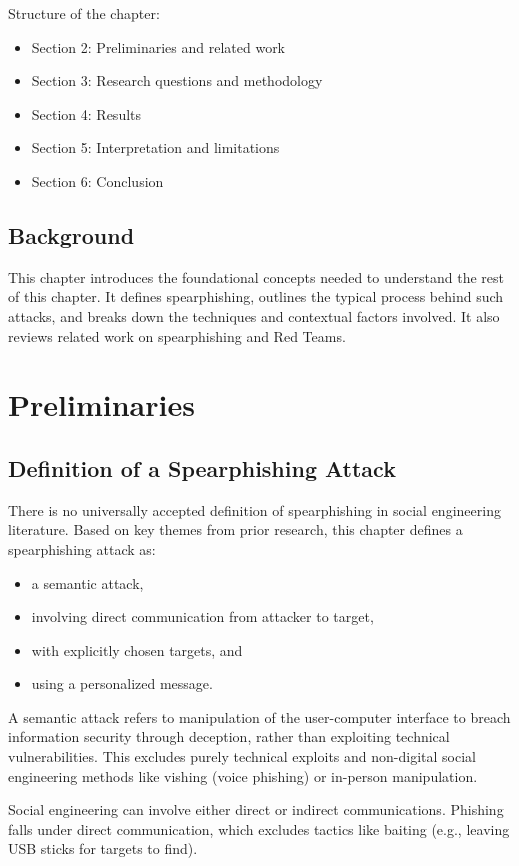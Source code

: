 Structure of the chapter:
\begin{itemize}
    \item Section 2: Preliminaries and related work
    \item Section 3: Research questions and methodology
    \item Section 4: Results
    \item Section 5: Interpretation and limitations
    \item Section 6: Conclusion
\end{itemize}

\subsection{Background}
This chapter introduces the foundational concepts needed to understand the rest of this chapter. It defines spearphishing, outlines the typical process behind such attacks, and breaks down the techniques and contextual factors involved. It also reviews related work on spearphishing and Red Teams.

\section{Preliminaries}
\subsection{Definition of a Spearphishing Attack}

There is no universally accepted definition of spearphishing in social engineering literature. Based on key themes from prior research, this chapter defines a spearphishing attack as:
\begin{itemize}
    \item a semantic attack,
    \item involving direct communication from attacker to target,
    \item with explicitly chosen targets, and
    \item using a personalized message.
\end{itemize}

A semantic attack refers to manipulation of the user-computer interface to breach information security through deception, rather than exploiting technical vulnerabilities. This excludes purely technical exploits and non-digital social engineering methods like vishing (voice phishing) or in-person manipulation.

Social engineering can involve either direct or indirect communications. Phishing falls under direct communication, which excludes tactics like baiting (e.g., leaving USB sticks for targets to find).

